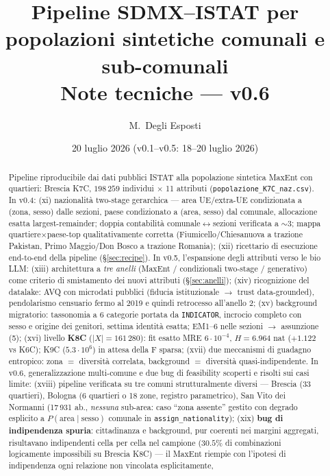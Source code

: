 \documentclass[11pt,a4paper]{article}
\title{\textbf{Pipeline SDMX--ISTAT per popolazioni sintetiche comunali e sub-comunali}\\[2mm]
\large Note tecniche --- v0.6}
\author{M.~Degli Esposti}
\date{20 luglio 2026 \quad (v0.1--v0.5: 18--20 luglio 2026)}
\newcommand{\code}[1]{\texttt{#1}}
\begin{document}
\maketitle

\begin{abstract}
\noindent
Pipeline riproducibile dai dati pubblici ISTAT alla popolazione sintetica
MaxEnt con quartieri: Brescia K7C, $198\,259$ individui $\times$ 11 attributi
(\code{popolazione\_K7C\_naz.csv}). In v0.4: (xi) nazionalit\`a two-stage
gerarchica --- area UE/extra-UE condizionata a (zona, sesso) dalle sezioni,
paese condizionato a (area, sesso) dal comunale, allocazione esatta
largest-remainder; doppia contabilit\`a comunale$\leftrightarrow$sezioni
verificata a $\sim3$\textperthousand; mappa quartiere$\times$paese-top
qualitativamente corretta (Fiumicello/Chiesanuova a trazione Pakistan,
Primo Maggio/Don Bosco a trazione Romania); (xii) ricettario di esecuzione
end-to-end della pipeline (\S\ref{sec:recipe}). In v0.5, l'espansione degli
attributi verso le bio LLM: (xiii) architettura a \emph{tre anelli}
(MaxEnt / condizionali two-stage / generativo) come criterio di smistamento
dei nuovi attributi (\S\ref{sec:anelli}); (xiv) ricognizione del datalake:
AVQ con microdati pubblici (fiducia istituzionale $\to$ trust data-grounded),
pendolarismo censuario fermo al 2019 e quindi retrocesso all'anello 2;
(xv) background migratorio: tassonomia a 6 categorie portata da
\code{INDICATOR}, incrocio completo con sesso e origine dei genitori,
settima identit\`a esatta; EM1--6 nelle sezioni $\to$ assunzione (5);
(xvi) livello \textbf{K8C} ($|X|=161\,280$): fit esatto MRE
$6\cdot10^{-4}$, $H=6.964$ nat ($+1.122$ vs K6C); K9C ($5.3\cdot10^6$)
in attesa della F sparsa; (xvii) due meccanismi di guadagno entropico:
zona $=$ diversit\`a correlata, background $=$ diversit\`a
quasi-indipendente. In v0.6, generalizzazione multi-comune e due bug di
feasibility scoperti e risolti sui casi limite: (xviii) pipeline verificata
su tre comuni strutturalmente diversi --- Brescia (33 quartieri), Bologna
(6 quartieri o 18 zone, registro parametrico), San Vito dei Normanni
(17\,931 ab., \emph{nessuna} sub-area: caso ``zona assente'' gestito con
degrado esplicito a $P(\text{area}\mid\text{sesso})$ comunale in
\code{assign\_nationality}); (xix) \textbf{bug di indipendenza spuria}:
cittadinanza e background, pur coerenti nei margini aggregati, risultavano
indipendenti cella per cella nel campione ($30.5\%$ di combinazioni
logicamente impossibili su Brescia K8C) --- il MaxEnt riempie con
l'ipotesi di indipendenza ogni relazione non vincolata esplicitamente,

\end{abstract}
\end{document}
